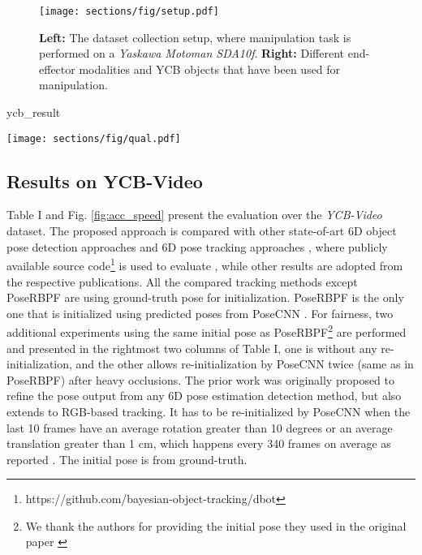 \documentclass[letterpaper, 10 pt, conference]{ieeeconf}
\begin{document}
\begin{figure}[t]
  \centering
  \texttt{[image: sections/fig/setup.pdf]}
  \vspace{-0.15in}
  \caption{\textbf{Left:} The dataset collection setup, where manipulation task is performed on a {\it Yaskawa Motoman SDA10f}. \textbf{Right:} Different end-effector modalities and YCB objects that have been used for manipulation.\vspace{-0.1in}}
  \label{fig:setup}
  \vspace{-0.1in}
\end{figure}

{ycb_result}


\begin{figure*}[t]
  \centering
  \texttt{[image: sections/fig/qual.pdf]}
  \vspace{-0.2in}
  \caption{\textbf{Left:} Qualitative results for tracking the  "large-clamp" object in the YCB-Video dataset. \textbf{Right:} Tracking results for "bleach-cleanser" being manipulated by a vacuum gripper in the {\it YCBInEOAT} dataset.\vspace{-0.1in}}
  \vspace{-0.in}
  \label{fig:qual_tomato}
\end{figure*}

\subsection{Results on YCB-Video}

Table I and Fig. \ref{fig:acc_speed} present the evaluation over the {\it YCB-Video} dataset. The proposed approach is compared with other state-of-art 6D object pose detection approaches   \cite{xiang2017posecnn, tremblay2018deep, li2018deepim, wang2019densefusion} and 6D pose tracking approaches \cite{deng2019poserbpf, li2018deepim, issac2016depth, Wthrich2013ProbabilisticOT}, where publicly available source code\footnote{https://github.com/bayesian-object-tracking/dbot} is used to evaluate \cite{issac2016depth,Wthrich2013ProbabilisticOT}, while other results are adopted from the respective publications. All the compared tracking methods except PoseRBPF are using ground-truth pose for initialization. PoseRBPF \cite{deng2019poserbpf} is the only one that is initialized using predicted poses from PoseCNN \cite{xiang2017posecnn}. For fairness, two additional experiments using the same initial pose as PoseRBPF\footnote{We thank the authors for providing the initial pose they used in the original paper \cite{deng2019poserbpf}} are performed and presented in the rightmost two columns of Table I, one is without any re-initialization, and the other allows re-initialization by PoseCNN twice (same as in PoseRBPF) after heavy occlusions. The prior work \cite{li2018deepim} was originally proposed to refine the pose output from any 6D pose estimation detection method, but also extends to RGB-based tracking. It has to be re-initialized by PoseCNN when the last 10 frames have an average rotation greater than 10 degrees or an average translation greater than 1 cm, which happens every 340 frames on average as reported \cite{li2018deepim}. The initial pose is from ground-truth. 
\end{document}
